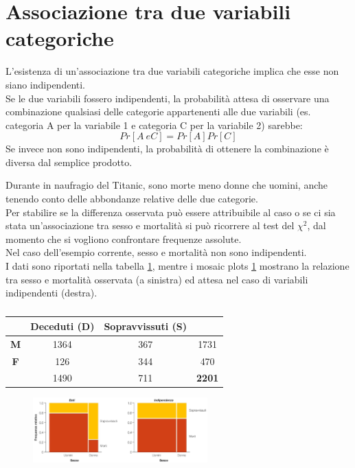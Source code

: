 \documentclass[10pt, draft]{book}
\newcounter{example}[section]
\begin{document}
\section{Associazione tra due variabili categoriche}
L'esistenza di un'associazione tra due variabili categoriche implica che esse non siano indipendenti.
\\
Se le due variabili fossero indipendenti, la probabilità attesa di osservare una combinazione qualsiasi delle categorie appartenenti alle due variabili (es. categoria A per la variabile 1 e categoria C per la variabile 2) sarebbe:
\begin{equation}
Pr[A\ e C] = Pr[A] Pr[C]
\end{equation}
Se invece non sono indipendenti, la probabilità di ottenere la combinazione è diversa dal semplice prodotto.
\begin{example}
    Durante in naufragio del Titanic, sono morte meno donne che uomini, anche tenendo conto delle abbondanze relative delle due categorie.
    \\
    Per stabilire se la differenza osservata può essere attribuibile al caso o se ci sia stata un'associazione tra sesso e mortalità si può ricorrere al test del $\chi^2$, dal momento che si vogliono confrontare frequenze assolute.
    \\
    Nel caso dell'esempio corrente, sesso e mortalità non sono indipendenti.
    \\
    I dati sono riportati nella tabella \ref{tabtitanic}, mentre i mosaic plots \ref{fig9.1-1} mostrano la relazione tra sesso e mortalità osservata (a sinistra) ed attesa nel caso di variabili indipendenti (destra).
\begin{table}[H]
        \centering
        \renewcommand\arraystretch{1.2}
        \begin{tabular}{c|c|c|c}
        \hline
         & \textbf{Deceduti (D)} & \textbf{Sopravvissuti (S)} & \\
        \hline
        \textbf{M} & 1364 & 367 & 1731 \\
        \hline
        \textbf{F} & 126 & 344 & 470\\
        \hline
         & 1490 & 711 & \textbf{2201}\\
        \hline
        \end{tabular}
        \caption{}
        \label{tabtitanic}
\end{table}\noindent
    \begin{figure}[H]\label{fig9.1-1}
    \centering
    \includegraphics[width=0.6\textwidth]{fig9.1-1}
    \caption{\small{}}
    \end{figure}
\end{example}
\end{document}
